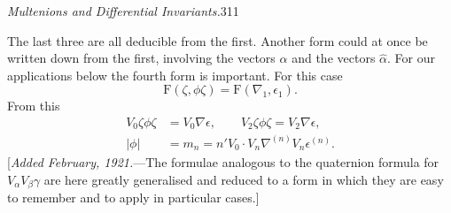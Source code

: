 \documentclass[11pt]{article}
\begin{document}
\newpage\thispagestyle{empty}\begin{center}\textit{Multenions and Differential Invariants.}\hfill 311\end{center}
The last three are all deducible from the first. Another form could at once be written down from the first, involving the vectors $\alpha$ and the vectors $\hat\alpha$. For our applications below the fourth form is important. For this case
\begin{equation}\mathrm F(\zeta,\phi\zeta)=\mathrm F(\nabla_1,\epsilon_1).\tag{10}\end{equation}
From this
\begin{align}V_0\zeta\phi\zeta&=V_0\nabla\epsilon,\qquad V_2\zeta\phi\zeta=V_2\nabla\epsilon,\tag{11}\\|\phi|&=m_n=n'V_0\cdot V_n\nabla^{(n)}V_n\epsilon^{(n)}.\tag{12}\end{align}
[\emph{Added February, 1921.}---The formulae analogous to the quaternion formula for $V_\alpha V_\beta\gamma$ are here greatly generalised and reduced to a form in which they are easy to remember and to apply in particular cases.]
\end{document}
